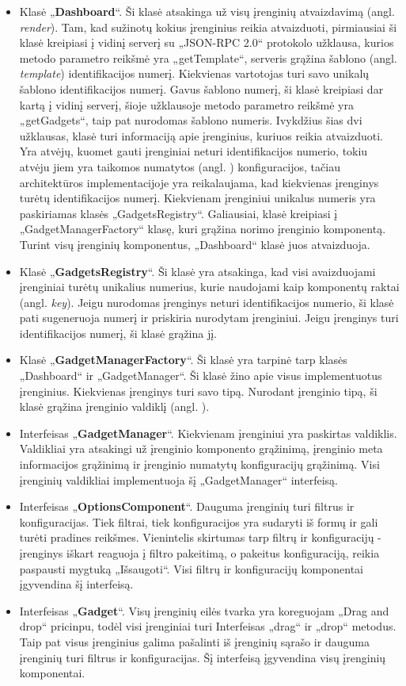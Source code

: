 \documentclass{VUMIFPSbakalaurinis}
\begin{document}
\begin{itemize}
    \item Klasė „\textbf{Dashboard}“. Ši klasė atsakinga už visų įrenginių atvaizdavimą (angl. \textit{render}). Tam, kad sužinotų kokius įrenginius reikia atvaizduoti, pirmiausiai ši klasė kreipiasi į vidinį serverį su „JSON-RPC 2.0“ protokolo užklausa, kurios metodo parametro reikšmė yra „getTemplate“, serveris grąžina šablono (angl. \textit{template}) identifikacijos numerį. Kiekvienas vartotojas turi savo unikalų šablono identifikacijos numerį. Gavus šablono numerį, ši klasė kreipiasi dar kartą į vidinį serverį, šioje užklausoje metodo parametro reikšmė yra „getGadgets“, taip pat nurodomas šablono numeris. Ivykdžius šias dvi užklausas, klasė turi informaciją apie įrenginius, kuriuos reikia atvaizduoti. Yra atvėjų, kuomet gauti įrenginiai neturi identifikacijos numerio, tokiu atvėju jiem yra taikomos numatytos (angl. ) konfiguracijos, tačiau architektūros implementacijoje yra reikalaujama, kad kiekvienas įrenginys turėtų identifikacijos numerį. Kiekvienam įrenginiui unikalus numeris yra paskiriamas klasės „GadgetsRegistry“. Galiausiai, klasė kreipiasi į „GadgetManagerFactory“ klasę, kuri grąžina norimo įrenginio komponentą. Turint visų įrenginių komponentus, „Dashboard“ klasė juos atvaizduoja.
    \item Klasė „\textbf{GadgetsRegistry}“. Ši klasė yra atsakinga, kad visi avaizduojami įrenginiai turėtų unikalius numerius, kurie naudojami kaip komponentų raktai (angl. \textit{key}). Jeigu nurodomas įrenginys neturi identifikacijos numerio, ši klasė pati sugeneruoja numerį ir priskiria nurodytam įrenginiui. Jeigu įrenginys turi identifikacijos numerį, ši klasė grąžina jį.
    \item Klasė „\textbf{GadgetManagerFactory}“. Ši klasė yra tarpinė tarp klasės „Dashboard“ ir „GadgetManager“. Ši klasė žino apie visus implementuotus įrenginius. Kiekvienas įrenginys turi savo tipą. Nurodant įrenginio tipą, ši klasė grąžina įrenginio valdiklį (angl. ). 
    \item Interfeisas „\textbf{GadgetManager}“. Kiekvienam įrenginiui yra paskirtas valdiklis. Valdikliai yra atsakingi už įrenginio komponento grąžinimą, įrenginio meta informacijos grąžinimą ir įrenginio numatytų konfiguracijų grąžinimą. Visi įrenginių valdikliai implementuoja šį „GadgetManager“ interfeisą.
    \item Interfeisas „\textbf{OptionsComponent}“. Dauguma įrenginių turi filtrus ir konfiguracijas. Tiek filtrai, tiek konfiguracijos yra sudaryti iš formų ir gali turėti pradines reikšmes. Vienintelis skirtumas tarp filtrų ir konfiguracijų - įrenginys iškart reaguoja į filtro pakeitimą, o pakeitus konfiguraciją, reikia paspausti mygtuką „Išsaugoti“. Visi filtrų ir konfiguracijų komponentai įgyvendina šį interfeisą.
    \item Interfeisas „\textbf{Gadget}“. Visų įrenginių eilės tvarka yra koreguojam „Drag and drop“ pricinpu, todėl visi įrenginiai turi Interfeisas „drag“ ir „drop“ metodus. Taip pat visus įrenginius galima pašalinti iš įrenginių sąrašo ir dauguma įrenginių turi filtrus ir konfiguracijas. Šį interfeisą įgyvendina visų įrenginių komponentai.
\end{itemize}
\end{document}
